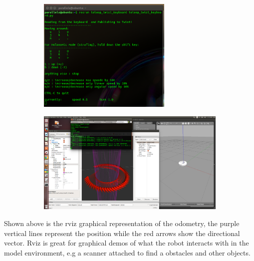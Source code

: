 \documentclass[a4paper, 10pt]{IEEEconf}
\begin{document}
\begin{figure}[H]
\begin{subfigure}{\textwidth}
	\begin{center}
  	\includegraphics[width=0.7\textwidth]{images/Teleop}
  	\label{fig:Teleop node running on ubuntu}
  	\end{center}
\end{subfigure}
\begin{subfigure}{\textwidth}
	\begin{center}
  	\includegraphics[width=\textwidth]{images/Position}
  	\label{fig:A model iRobot Create spawned in Gazebo using teleop node for movements}
  	\end{center}
\end{subfigure}
\end{figure}

Shown above is the rviz graphical representation of the odometry, the purple vertical lines represent the position while the red arrows show the directional vector. Rviz is great for graphical demos of what the robot interacts with in the model environment, e.g a scanner attached to find a obstacles and other objects.
\end{document}
